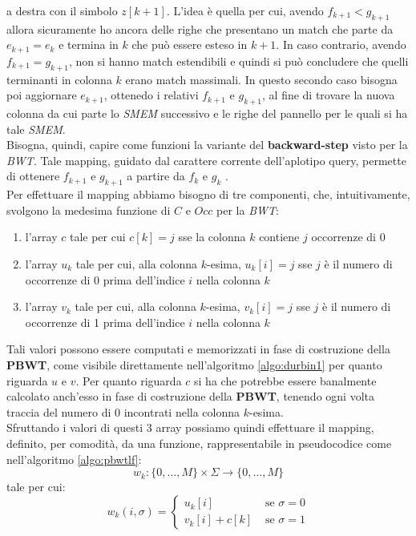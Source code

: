 a destra con il simbolo $z[k+1]$. L'idea è quella per cui, avendo
$f_{k+1}<g_{k+1}$ allora sicuramente ho ancora delle righe che presentano un
match che parte da $e_{k+1}=e_{k}$ e termina in $k$ che può essere esteso in
$k+1$. In caso contrario, avendo $f_{k+1}=g_{k+1}$, non si hanno match
estendibili e quindi si può concludere che quelli terminanti in colonna $k$
erano match massimali. In questo secondo caso bisogna poi aggiornare $e_{k+1}$,
ottenedo i relativi $f_{k+1}$ e $g_{k+1}$, al fine di trovare la nuova colonna
da cui parte lo \textit{SMEM} successivo e le righe del pannello per le quali si
ha tale \textit{SMEM}. \\
Bisogna, quindi, capire come funzioni la
variante del \textbf{backward-step} visto per la \textit{BWT}. Tale mapping,
guidato dal carattere corrente dell'aplotipo query, permette di ottenere
$f_{k+1}$ e $g_{k+1}$ a partire da $f_k$ e $g_k$ .\\ 
Per effettuare il mapping abbiamo bisogno di tre componenti, che,
intuitivamente, svolgono la medesima funzione di $C$ e $Occ$ per la
\textit{BWT}: 
\begin{enumerate}
  \item l'array $c$ tale per cui $c[k]=j$ sse la colonna $k$ contiene $j$
  occorrenze di 0
  \item l'array $u_k$ tale per cui, alla colonna $k$-esima, $u_k[i]=j$ sse $j$ è
  il numero di occorrenze di 0 prima dell'indice $i$ nella colonna $k$
  \item l'array $v_k$ tale per cui, alla colonna $k$-esima, $v_k[i]=j$ sse $j$ è
  il numero di occorrenze di 1 prima dell'indice $i$ nella colonna $k$ 
\end{enumerate}
Tali valori possono essere computati e memorizzati in fase di costruzione della
\textbf{PBWT}, come visibile direttamente nell'algoritmo \ref{algo:durbin1} per
quanto riguarda $u$ e $v$. Per quanto riguarda $c$
si ha che potrebbe essere banalmente calcolato anch'esso in fase di costruzione
della \textbf{PBWT}, tenendo ogni volta traccia del numero di 0 incontrati
nella colonna $k$-esima.\\
Sfruttando i valori di questi 3 array possiamo quindi effettuare il mapping,
definito, per comodità, da una funzione, rappresentabile in pseudocodice come
nell'algoritmo \ref{algo:pbwtlf}:
\begin{equation}
  \label{eq:pbwtw1}
  w_k:\{0,\ldots,M\}\times\Sigma\to \{0,\ldots,M\}
\end{equation}
tale per cui:
\begin{equation}
  \label{eq:pbwtw2}
  w_k(i,\sigma)=
  \begin{cases}
    u_k[i]&\mbox{ se }\sigma=0\\
    v_k[i]+c[k]&\mbox{ se }\sigma=1
  \end{cases}
\end{equation}

